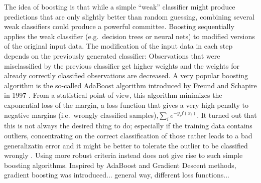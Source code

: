 The idea of boosting is that while a simple ``weak'' classifier might produce predictions that are only slightly better than random guessing, combining several weak classifiers could produce a powerful committee. 
Boosting sequentially applies the weak classifier (e.g.\ decision trees or neural nets) to modified versions of the original input data. 
The modification of the input data in each step depends on the previously generated classifier: Observations that were misclassified by the previous classifier get higher weights and the weights for already correctly classified observations are decreased. 
A very popular boosting algorithm is the so-called AdaBoost algorithm introduced by Freund and Schapire in 1997 . 
From a statistical point of view, this algorithm minimizes the exponential loss of the margin, a loss function that gives a very high penalty to negative margins (i.e.\ wrongly classified samples),$\sum_i e^{-y_i f(x_i)}$. 
It turned out that this is not always the desired thing to do; especially if the training data contains outliers, concentrating on the correct classification of those rather leads to a bad generalizatin error and it might be better to tolerate the outlier to be classified wrongly . 
Using more robust criteria instead does not give rise to such simple boosting algorithms. 
Inspired by AdaBoost and Gradient Descent methods, gradient boosting was introduced... general way, different loss functions...
